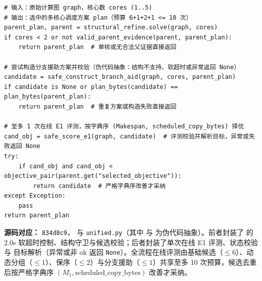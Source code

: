 \documentclass[anonymous,withtoc]{gmcm2026}
\renewcommand{\thealgorithm}{\thesection-\arabic{algorithm}}
\begin{document}
\FloatBarrier
\FloatBarrier\par{}\begingroup\normalsize
\captionsetup{type=algorithm,position=top,justification=raggedright,singlelinecheck=false,labelfont=bf}
\label{alg:p1-unified}
\begin{tcolorbox}[enhanced,breakable,colback=white,colframe=black,
  boxrule=0pt,toprule=.4pt,bottomrule=.4pt,sharp corners,boxsep=0pt,
  left=0pt,right=0pt,top=4pt,bottom=4pt,before skip=2pt,after skip=2pt,
  title after break={算法~\thealgorithm（续）},
  colbacktitle=white,coltitle=black,fonttitle=\normalsize\bfseries]



\begin{lstlisting}[style=paperpseudo]
# 输入：原始计算图 graph，核心数 cores (1..5)
# 输出：选中的多核心调度方案 plan（预算 6+1+2+1 <= 10 次）
parent_plan, parent = structural_refine.solve(graph, cores)
if cores < 2 or not valid_parent_evidence(parent, parent_plan):
    return parent_plan  # 单核或无合法父证据直接返回

# 尝试构造分支援助方案并校验（伪代码抽象：结构不支持、软超时或异常返回 None）
candidate = safe_construct_branch_aid(graph, cores, parent_plan)
if candidate is None or plan_bytes(candidate) == plan_bytes(parent_plan):
    return parent_plan  # 重复方案或构造失败直接返回

# 至多 1 次在线 E1 评测，按字典序 (Makespan, scheduled_copy_bytes) 择优
cand_obj = safe_score_e1(graph, candidate)  # 评测校验并解析目标，异常或失败返回 None
try:
    if cand_obj and cand_obj < objective_pair(parent.get("selected_objective")):
        return candidate  # 严格字典序改善才采纳
except Exception:
    pass
return parent_plan
\end{lstlisting}
\textbf{源码对应：} \texttt{834d8c9}，\texttt{} 与 \texttt{unified.py}（其中 \texttt{} 与 \texttt{} 为伪代码抽象）。前者封装了 \texttt{} 的 2.0s 软超时控制、结构守卫与候选校验；后者封装了单次在线 E1 评测、状态校验与 \texttt{} 目标解析（异常或非 ok 返回 \texttt{None}）。全流程在线评测由基础候选（\(\le 6\)）、动态分组（\(\le 1\)）、保序（\(\le 2\)）与分支援助（\(\le 1\)）共享至多 10 次预算，候选去重后按严格字典序 \((M_1, \text{scheduled\_copy\_bytes})\) 改善才采纳。

\end{tcolorbox}\endgroup
\end{document}
